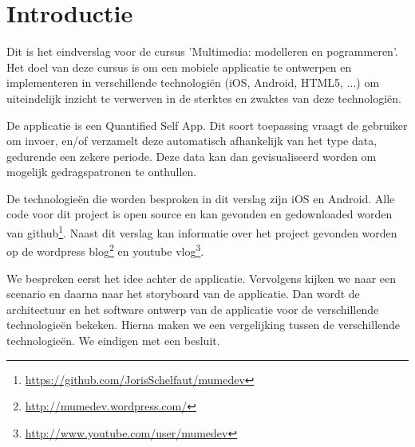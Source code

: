 \chapter{Introductie}\label{chapter:introductie}

Dit is het eindverslag voor de cursus 'Multimedia: modelleren en pogrammeren'. Het doel van deze cursus is om een mobiele applicatie te ontwerpen en implementeren in verschillende technologi\"en (iOS, Android, HTML5, ...) om uiteindelijk inzicht te verwerven in de sterktes en zwaktes van deze technologi\"en.

De applicatie is een Quantified Self App. Dit soort toepassing vraagt de gebruiker om invoer, en/of verzamelt deze automatisch afhankelijk van het type data, gedurende een zekere periode. Deze data kan dan gevisualiseerd worden om mogelijk gedragspatronen te onthullen\cite{govaerts2012}.

De technologie\"en die worden besproken in dit verslag zijn iOS en Android. Alle code voor dit project is open source en kan gevonden en gedownloaded worden van github\footnote{\url{https://github.com/JorisSchelfaut/mumedev}}. Naast dit verslag kan informatie over het project gevonden worden op de wordpress blog\footnote{\url{http://mumedev.wordpress.com/}} en youtube vlog\footnote{\url{http://www.youtube.com/user/mumedev}}.

We bespreken eerst het idee achter de applicatie. Vervolgens kijken we naar een scenario en daarna naar het storyboard van de applicatie. Dan wordt de architectuur en het software ontwerp van de applicatie voor de verschillende technologie\"en bekeken. Hierna maken we een vergelijking tussen de verschillende technologie\"en. We eindigen met een besluit.